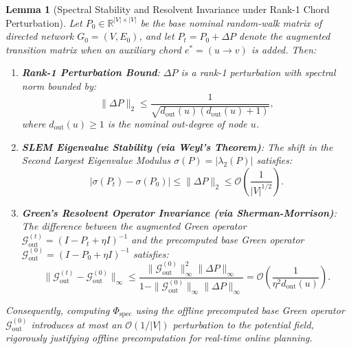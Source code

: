 \documentclass[11pt,a4paper]{article}
\newtheorem{lemma}{Lemma}
\begin{document}
\begin{lemma}[Spectral Stability and Resolvent Invariance under Rank-1 Chord Perturbation]
\label{lem:weyl_stability}
Let $P_0 \in \mathbb{R}^{|V| \times |V|}$ be the base nominal random-walk matrix of directed network $G_0 = (V, E_0)$, and let $P_t = P_0 + \Delta P$ denote the augmented transition matrix when an auxiliary chord $e^* = (u \to v)$ is added. Then:
\begin{enumerate}
    \item \textbf{Rank-1 Perturbation Bound}: $\Delta P$ is a rank-1 perturbation with spectral norm bounded by:
    \begin{equation}
    \|\Delta P\|_2 \le \frac{1}{\sqrt{d_{\text{out}}(u) (d_{\text{out}}(u) + 1)}},
    \end{equation}
    where $d_{\text{out}}(u) \ge 1$ is the nominal out-degree of node $u$.
    \item \textbf{SLEM Eigenvalue Stability (via Weyl's Theorem)}: The shift in the Second Largest Eigenvalue Modulus $\sigma(P) = |\lambda_2(P)|$ satisfies:
    \begin{equation}
    \left| \sigma(P_t) - \sigma(P_0) \right| \le \|\Delta P\|_2 \le \mathcal{O}\left( \frac{1}{|V|^{1/2}} \right).
    \end{equation}
    \item \textbf{Green's Resolvent Operator Invariance (via Sherman-Morrison)}: The difference between the augmented Green operator $\mathcal{G}_{\text{out}}^{(t)} = (I - P_t + \eta I)^{-1}$ and the precomputed base Green operator $\mathcal{G}_{\text{out}}^{(0)} = (I - P_0 + \eta I)^{-1}$ satisfies:
    \begin{equation}
    \|\mathcal{G}_{\text{out}}^{(t)} - \mathcal{G}_{\text{out}}^{(0)}\|_\infty \le \frac{\|\mathcal{G}_{\text{out}}^{(0)}\|_\infty^2 \|\Delta P\|_\infty}{1 - \|\mathcal{G}_{\text{out}}^{(0)}\|_\infty \|\Delta P\|_\infty} = \mathcal{O}\left( \frac{1}{\eta^2 d_{\text{out}}(u)} \right).
    \end{equation}
\end{enumerate}
Consequently, computing $\Phi_{\text{spec}}$ using the offline precomputed base Green operator $\mathcal{G}_{\text{out}}^{(0)}$ introduces at most an $\mathcal{O}(1/|V|)$ perturbation to the potential field, rigorously justifying offline precomputation for real-time online planning.
\end{lemma}
\end{document}
